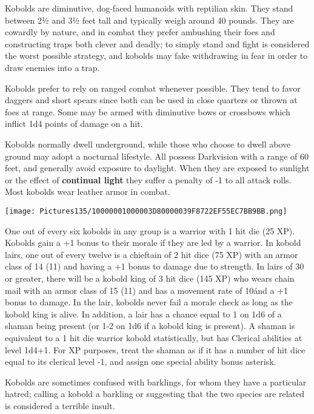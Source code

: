 \documentclass[a4paper,twoside,openany,10pt]{book}
\begin{document}
\begin{multicols}{2}
Kobolds are diminutive, dog-faced humanoids with reptilian skin. They stand between 2½ and 3½ feet tall and typically weigh around 40 pounds. They are cowardly by nature, and in combat they prefer ambushing their foes and constructing traps both clever and deadly; to simply stand and fight is considered the worst possible strategy, and kobolds may fake withdrawing in fear in order to draw enemies into a trap.

Kobolds prefer to rely on ranged combat whenever possible. They tend to favor daggers and short spears since both can be used in close quarters or thrown at foes at range. Some may be armed with diminutive bows or crossbows which inflict 1d4 points of damage on a hit. 

Kobolds normally dwell underground, while those who choose to dwell above ground may adopt a nocturnal lifestyle. All possess Darkvision with a range of 60 feet, and generally avoid exposure to daylight. When they are exposed to sunlight or the effect of \textbf{continual light }they suffer a penalty of -1 to all attack rolls. Most kobolds wear leather armor in combat.\\


\begin{center}
	 \texttt{[image: Pictures135/10000001000003D80000039F8722EF55EC7BB9BB.png]}
\end{center} \medskip

One out of every six kobolds in any group is a warrior with 1 hit die (25 XP). Kobolds gain a +1 bonus to their morale if they are led by a warrior. In kobold lairs, one out of every twelve is a chieftain of 2 hit dice (75 XP) with an armor class of 14 (11) and having a +1 bonus to damage due to strength. In lairs of 30 or greater, there will be a kobold king of 3 hit dice (145 XP) who wears chain mail with an armor class of 15 (11) and has a movement rate of 10\' and a +1 bonus to damage. In the lair, kobolds never fail a morale check as long as the kobold king is alive. In addition, a lair has a chance equal to 1 on 1d6 of a shaman being present (or 1-2 on 1d6 if a kobold king is present). A shaman is equivalent to a 1 hit die warrior kobold statistically, but has Clerical abilities at level 1d4+1. For XP purposes, treat the shaman as if it has a number of hit dice equal to its clerical level -1, and assign one special ability bonus asterisk.

Kobolds are sometimes confused with barklings, for whom they have a particular hatred; calling a kobold a barkling or suggesting that the two species are related is considered a terrible insult.



\end{multicols}
\end{document}
